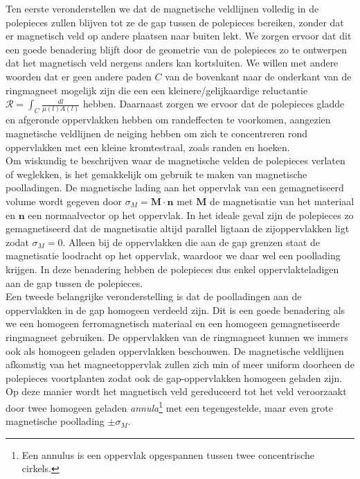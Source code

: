 \documentclass[we,twoside,openright,a4paper,11pt]{uantwerpenbamathesis}
\begin{document}
Ten eerste veronderstellen we dat de magnetische veldlijnen volledig in de polepieces zullen blijven tot ze de gap tussen de polepieces bereiken, zonder dat er magnetisch veld op andere plaatsen naar buiten lekt. We zorgen ervoor dat dit een goede benadering blijft door de geometrie van de polepieces zo te ontwerpen dat het magnetisch veld nergens anders kan kortsluiten. We willen met andere woorden dat er geen andere paden $C$ van de bovenkant naar de onderkant van de ringmagneet mogelijk zijn die een een kleinere/gelijkaardige reluctantie $\mathcal{R}=\int_C\frac{dl}{\mu(l)A(l)}$ hebben. Daarnaast zorgen we ervoor dat de polepieces gladde en afgeronde oppervlakken hebben om randeffecten te voorkomen, aangezien magnetische veldlijnen de neiging hebben om zich te concentreren rond oppervlakken met een kleine kromtestraal, zoals randen en hoeken.\\

Om wiskundig te beschrijven waar de magnetische velden de polepieces verlaten of weglekken, is het gemakkelijk om gebruik te maken van magnetische poolladingen. De magnetische lading aan het oppervlak van een gemagnetiseerd volume wordt gegeven door $\sigma_M=\mathbf{M}\cdot\mathbf{n}$ met $\mathbf{M}$ de magnetisatie van het materiaal en $\mathbf{n}$ een normaalvector op het oppervlak. In het ideale geval zijn de polepieces zo gemagnetiseerd dat de magnetisatie altijd parallel ligtaan de zijoppervlakken ligt zodat $\sigma_M=0$. Alleen bij de oppervlakken die aan de gap grenzen staat de magnetisatie loodracht op het oppervlak, waardoor we daar wel een poollading krijgen. In deze benadering hebben de polepieces dus enkel oppervlakteladigen aan de gap tussen de polepieces.\\

Een tweede belangrijke veronderstelling is dat de poolladingen aan de oppervlakken in de gap homogeen verdeeld zijn. Dit is een goede benadering als we een homogeen ferromagnetisch materiaal en een homogeen gemagnetiseerde ringmagneet gebruiken. De oppervlakken van de ringmagneet kunnen we immers ook als homogeen geladen oppervlakken beschouwen. De magnetische veldlijnen afkomstig van het magneetoppervlak zullen zich min of meer uniform doorheen de polepieces voortplanten zodat ook de gap-oppervlakken homogeen geladen zijn. Op deze manier wordt het magnetisch veld gereduceerd tot het veld veroorzaakt door twee homogeen geladen \textit{annula}\footnote{Een annulus is een oppervlak opgespannen tussen twee concentrische cirkels.} met een tegengestelde, maar even grote magnetische poollading $\pm\sigma_M$.\\
\end{document}
